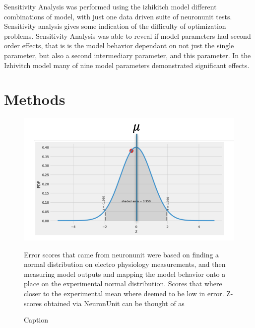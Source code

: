Sensitivity Analysis was performed using the izhikitch model different combinations of model, with just one data driven suite of neuronunit tests. Sensitivity analysis gives some indication of the difficulty of optimization problems.\newline
\newline
Sensitivity Analysis was able to reveal if model parameters had second order effects, that is is the model behavior dependant on not just the single parameter, but also a second intermediary parameter, and this parameter. \newline
\newline
In the Izhivitch model many of nine model parameters demonstrated significant effects.
\chapter*{Methods}



\begin{figure}
	\includegraphics[width=\maxwidth{\textwidth}]{figures/normal_distribution.png}
	\caption{Error scores that came from neuronunit were based on finding a normal distribution on electro physiology measurements, and then measuring model outputs and mapping the model behavior onto a place on the experimental normal distribution. Scores that where closer to the experimental mean where deemed to be low in error.
	Z-scores obtained via NeuronUnit can be thought of as  }
	\label{figure\arabic{figurecounter}}
	
\caption{Caption}
	
\end{figure}

